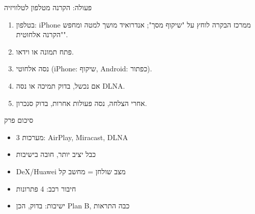\begin{tcbpractice}{פעולה: הקרנה מטלפון לטלוויזיה}
\begin{enumerate}
  \item בטלפון: iPhone ממרכז הבקרה לוחץ על "שיקוף מסך"; אנדרואיד מושך למטה ומחפש "הקרנה אלחוטית".
  \item פתח תמונה או וידאו.
  \item נסה אלחוטי (iPhone: שיקוף, Android: כפתור).
  \item אם נכשל, בדוק תמיכה או נסה DLNA.
  \item אחרי הצלחה, נסה פעולות אחרות, בדוק סנכרון.
\end{enumerate}

\end{tcbpractice}

\begin{tcbsummary}{סיכום פרק}
\begin{itemize}
  \item 3 מערכות: AirPlay, Miracast, DLNA
  \item כבל יציב יותר, חובה בישיבות
  \item DeX/Huawei מצב שולחן = מחשב קל
  \item חיבור רכב: 4 פתרונות
  \item ישיבות: בדוק, הכן Plan B, כבה התראות
\end{itemize}

\end{tcbsummary}
